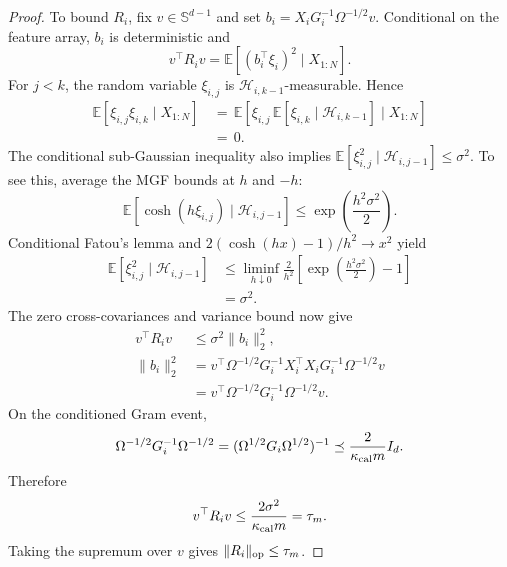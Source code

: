 \documentclass{article} %
\begin{document}
\begin{proof}
To bound \(R_i\), fix \(v\in\mathbb S^{d-1}\) and set
\(b_i=X_iG_i^{-1}\Omega^{-1/2}v\). Conditional on the feature array,
\(b_i\) is deterministic and
\begin{equation}
v^\top R_i v
=
\mathbb{E}\!\left[(b_i^\top\xi_i)^2\mid X_{1:N}\right].
\end{equation}
For \(j<k\), the random variable \(\xi_{i,j}\) is
\(\mathcal{H}_{i,k-1}\)-measurable.  Hence
\begin{equation}
\begin{aligned}
\mathbb{E}[\xi_{i,j}\xi_{i,k}\mid X_{1:N}]
&\,=\,
\mathbb{E}\!\left[
\xi_{i,j}\,
\mathbb{E}[\xi_{i,k}\mid\mathcal{H}_{i,k-1}]
\mid X_{1:N}
\right]
\\
&\,=\,
0.
\end{aligned}
\end{equation}
The conditional sub-Gaussian inequality also implies
\(\mathbb{E}[\xi_{i,j}^2\mid\mathcal{H}_{i,j-1}]\leq\sigma^2\). To see
this, average the MGF bounds at \(h\) and \(-h\):
\begin{equation}
\mathbb E\!\left[
\cosh(h\xi_{i,j})\mid\mathcal H_{i,j-1}
\right]
\leq
\exp\!\left(\frac{h^2\sigma^2}{2}\right).
\end{equation}
Conditional Fatou's lemma and
\(2(\cosh(hx)-1)/h^2\to x^2\) yield
\begin{equation}
\begin{aligned}
\mathbb E\!\left[
\xi_{i,j}^2\mid\mathcal H_{i,j-1}
\right]
&\leq
\liminf_{h\downarrow0}
\frac{2}{h^2}
\left[
\exp\!\left(\frac{h^2\sigma^2}{2}\right)-1
\right]
\\
&=
\sigma^2.
\end{aligned}
\end{equation}
The zero cross-covariances and variance bound now give
\begin{equation}
\begin{aligned}
v^\top R_i v
&\leq
\sigma^2\|b_i\|_2^2,
\\
\|b_i\|_2^2
&=
v^\top\Omega^{-1/2}G_i^{-1}X_i^\top X_iG_i^{-1}\Omega^{-1/2}v
\\
&=
v^\top\Omega^{-1/2}G_i^{-1}\Omega^{-1/2}v.
\end{aligned}
\end{equation}
On the conditioned Gram event,
\begin{equation}
\Omega^{-1/2}G_i^{-1}\Omega^{-1/2}
=
(\Omega^{1/2}G_i\Omega^{1/2})^{-1}
\preceq
\frac{2}{\kappa_{\rm cal}m}I_d.
\end{equation}
Therefore
\begin{equation}
v^\top R_i v
\leq
\frac{2\sigma^2}{\kappa_{\rm cal}m}
=
\tau_m.
\end{equation}
Taking the supremum over \(v\) gives \(\|R_i\|_{\rm op}\leq\tau_m\).


\end{proof}
\end{document}
